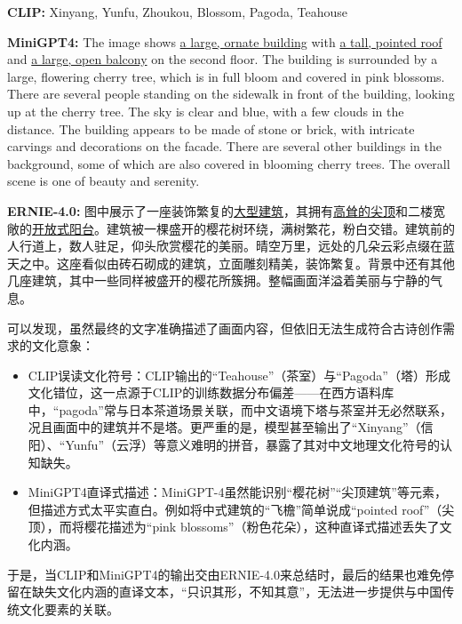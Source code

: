 {\kaishu 
\textbf{CLIP:} Xinyang, Yunfu, Zhoukou, Blossom, Pagoda, Teahouse\par
\textbf{MiniGPT4:} The image shows \underline{a large, ornate building} with \underline{a tall, pointed roof} and \underline{a large, open balcony} on the second floor. The building is surrounded by a large, flowering cherry tree, which is in full bloom and covered in pink blossoms. There are several people standing on the sidewalk in front of the building, looking up at the cherry tree. The sky is clear and blue, with a few clouds in the distance. The building appears to be made of stone or brick, with intricate carvings and decorations on the facade. There are several other buildings in the background, some of which are also covered in blooming cherry trees. The overall scene is one of beauty and serenity. \par
\textbf{ERNIE-4.0:} 图中展示了一座装饰繁复的\underline{大型建筑}，其拥有\underline{高耸的尖顶}和二楼宽敞的\underline{开放式阳台}。建筑被一棵盛开的樱花树环绕，满树繁花，粉白交错。建筑前的人行道上，数人驻足，仰头欣赏樱花的美丽。晴空万里，远处的几朵云彩点缀在蓝天之中。这座看似由砖石砌成的建筑，立面雕刻精美，装饰繁复。背景中还有其他几座建筑，其中一些同样被盛开的樱花所簇拥。整幅画面洋溢着美丽与宁静的气息。
}

可以发现，虽然最终的文字准确描述了画面内容，但依旧无法生成符合古诗创作需求的文化意象：
\begin{itemize}
  \item CLIP误读文化符号：CLIP输出的“Teahouse”（茶室）与“Pagoda”（塔）形成文化错位，这一点源于CLIP的训练数据分布偏差——在西方语料库中，“pagoda”常与日本茶道场景关联，而中文语境下塔与茶室并无必然联系，况且画面中的建筑并不是塔。更严重的是，模型甚至输出了“Xinyang”（信阳）、“Yunfu”（云浮）等意义难明的拼音，暴露了其对中文地理文化符号的认知缺失。
  \item MiniGPT4直译式描述：MiniGPT-4虽然能识别“樱花树”“尖顶建筑”等元素，但描述方式太平实直白。例如将中式建筑的“飞檐”简单说成“pointed roof”（尖顶），而将樱花描述为“pink blossoms”（粉色花朵），这种直译式描述丢失了文化内涵。
\end{itemize}

于是，当CLIP和MiniGPT4的输出交由ERNIE-4.0来总结时，最后的结果也难免停留在缺失文化内涵的直译文本，“只识其形，不知其意”，无法进一步提供与中国传统文化要素的关联。

